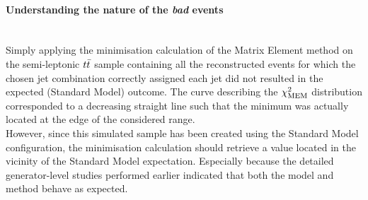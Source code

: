 \paragraph{Understanding the nature of the \textit{bad} events} \hfill \\

Simply applying the minimisation calculation of the Matrix Element method on the semi-leptonic $t\bar{t}$ sample containing all the reconstructed events for which the chosen jet combination correctly assigned each jet did not resulted in the expected (Standard Model) outcome. The curve describing the $\chi^{2}_{\textrm{MEM}}$ distribution corresponded to a decreasing straight line such that the minimum was actually located at the edge of the considered range.
\\
However, since this simulated sample has been created using the Standard Model configuration, the minimisation calculation should retrieve a value located in the vicinity of the Standard Model expectation.
Especially because the detailed generator-level studies performed earlier indicated that both the model and method behave as expected.
\\

